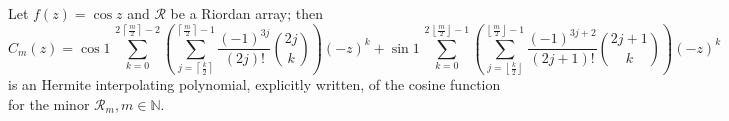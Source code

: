 
\begin{theorem}
\label{thm:cos-Hermite-interpolating-polys}
Let $f(z)=\cos{z}$ and $\mathcal{R}$ be a Riordan array; then 
\begin{equation}
  \label{eq:cos-Hermite-interpolating-poly-implicit}
  C_{m}(z) = \cos{1}\,\sum_{k=0}^{2\,\left\lceil \frac{m}{2} \right\rceil-2}{\left(\sum_{j=\left\lceil \frac{k}{2}\right\rceil}^{\left\lceil \frac{m}{2} \right\rceil -1}{\frac{(-1)^{3j}}{(2j)!}{2j\choose k}}\right) {(-z)^{k}}}
       + \sin{1}\,\sum_{k=0}^{2\,\left\lfloor \frac{m}{2} \right\rfloor-1}{\left(\sum_{j=\left\lfloor \frac{k}{2}\right\rfloor}^{\left\lfloor \frac{m}{2} \right\rfloor -1}{\frac{(-1)^{3j+2}}{(2j + 1)!} {2j+1\choose k}}\right){(-z)^{k}}}
\end{equation}
is an Hermite interpolating polynomial, explicitly written, of the cosine
function for the minor $\mathcal{R}_{m}, m\in\mathbb{N}$.
\end{theorem}

